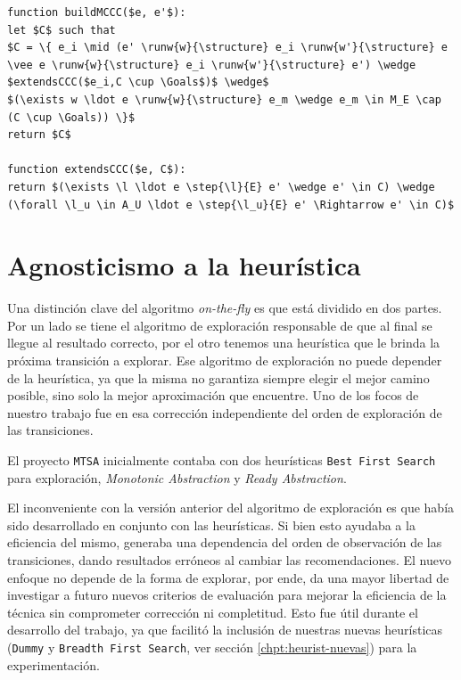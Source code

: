 \begin{lstlisting}[language={pseudocode},label={lst:viejoMCCC},caption={vieja descripción estados ganadores},float=ht, frame=single]
function buildMCCC($e, e'$):
let $C$ such that
$C = \{ e_i \mid (e' \runw{w}{\structure} e_i \runw{w'}{\structure} e \vee e \runw{w}{\structure} e_i \runw{w'}{\structure} e') \wedge $extendsCCC($e_i,C \cup \Goals$)$ \wedge$
$(\exists w \ldot e \runw{w}{\structure} e_m \wedge e_m \in M_E \cap (C \cup \Goals)) \}$
return $C$

function extendsCCC($e, C$):
return $(\exists \l \ldot e \step{\l}{E} e' \wedge e' \in C) \wedge (\forall \l_u \in A_U \ldot e \step{\l_u}{E} e' \Rightarrow e' \in C)$

\end{lstlisting}

\section{Agnosticismo a la heurística}

Una distinción clave del algoritmo \textit{on-the-fly} es que está dividido en dos partes. Por un lado se tiene el algoritmo de exploración responsable de que al final se llegue al resultado correcto, por el otro tenemos una heurística que le brinda la próxima transición a explorar. Ese algoritmo de exploración no puede depender de la heurística, ya que la misma no garantiza siempre elegir el mejor camino posible, sino solo la mejor aproximación que encuentre. Uno de los focos de nuestro trabajo fue en esa corrección independiente del orden de exploración de las transiciones.

El proyecto \texttt{MTSA} inicialmente contaba con dos heurísticas \texttt{Best First Search} para exploración, \textit{Monotonic Abstraction} y \textit{Ready Abstraction}. 

El inconveniente con la versión anterior del algoritmo de exploración es que había sido desarrollado en conjunto con las heurísticas. Si bien esto ayudaba a la eficiencia del mismo, generaba una dependencia del orden de observación de las transiciones, dando resultados erróneos al cambiar las recomendaciones. El nuevo enfoque no depende de la forma de explorar, por ende, da una mayor libertad de investigar a futuro nuevos criterios de evaluación para mejorar la eficiencia de la técnica sin comprometer corrección ni completitud. Esto fue útil durante el desarrollo del trabajo, ya que facilitó la inclusión de nuestras nuevas heurísticas (\texttt{Dummy} y \texttt{Breadth First Search}, ver sección \ref{chpt:heurist-nuevas}) para la experimentación.





